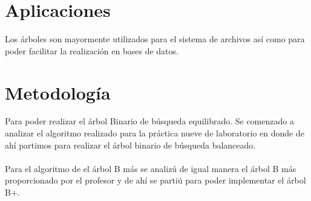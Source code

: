 \documentclass[11pt,a4paper]{report}
\begin{document}
\section{Aplicaciones}
Los \'arboles son mayormente utilizados para el sistema de archivos as\'i como para  poder facilitar la realizaci\'on en bases de datos.
\section{Metodolog\'ia}
Para poder realizar el \'arbol Binario de b\'usqueda equilibrado. Se comenzado a analizar el algoritmo realizado para la pr\'actica nueve de laboratorio en donde de ah\'i partimos para realizar el \'arbol binario de b\'usqueda balanceado.
\\
\\
Para el algoritmo de el \'arbol B m\'as se analiz\'u de igual manera el \'arbol B m\'as proporcionado por el profesor y de ah\'i se parti\'u para poder implementar el \'arbol B+.
\\
\\
\\
\end{document}
